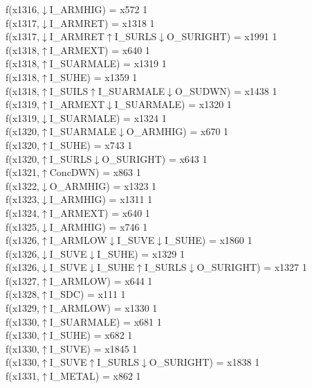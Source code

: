 f(x1316,$\downarrow$I\_ARMHIG) = x572 {1} \\
f(x1317,$\downarrow$I\_ARMRET) = x1318 {1} \\
f(x1317,$\downarrow$I\_ARMRET$\uparrow$I\_SURLS$\downarrow$O\_SURIGHT) = x1991 {1} \\
f(x1318,$\uparrow$I\_ARMEXT) = x640 {1} \\
f(x1318,$\uparrow$I\_SUARMALE) = x1319 {1} \\
f(x1318,$\uparrow$I\_SUHE) = x1359 {1} \\
f(x1318,$\uparrow$I\_SUILS$\uparrow$I\_SUARMALE$\downarrow$O\_SUDWN) = x1438 {1} \\
f(x1319,$\uparrow$I\_ARMEXT$\downarrow$I\_SUARMALE) = x1320 {1} \\
f(x1319,$\downarrow$I\_SUARMALE) = x1324 {1} \\
f(x1320,$\uparrow$I\_SUARMALE$\downarrow$O\_ARMHIG) = x670 {1} \\
f(x1320,$\uparrow$I\_SUHE) = x743 {1} \\
f(x1320,$\uparrow$I\_SURLS$\downarrow$O\_SURIGHT) = x643 {1} \\
f(x1321,$\uparrow$ConcDWN) = x863 {1} \\
f(x1322,$\downarrow$O\_ARMHIG) = x1323 {1} \\
f(x1323,$\downarrow$I\_ARMHIG) = x1311 {1} \\
f(x1324,$\uparrow$I\_ARMEXT) = x640 {1} \\
f(x1325,$\downarrow$I\_ARMHIG) = x746 {1} \\
f(x1326,$\uparrow$I\_ARMLOW$\downarrow$I\_SUVE$\downarrow$I\_SUHE) = x1860 {1} \\
f(x1326,$\downarrow$I\_SUVE$\downarrow$I\_SUHE) = x1329 {1} \\
f(x1326,$\downarrow$I\_SUVE$\downarrow$I\_SUHE$\uparrow$I\_SURLS$\downarrow$O\_SURIGHT) = x1327 {1} \\
f(x1327,$\uparrow$I\_ARMLOW) = x644 {1} \\
f(x1328,$\uparrow$I\_SDC) = x111 {1} \\
f(x1329,$\uparrow$I\_ARMLOW) = x1330 {1} \\
f(x1330,$\uparrow$I\_SUARMALE) = x681 {1} \\
f(x1330,$\uparrow$I\_SUHE) = x682 {1} \\
f(x1330,$\uparrow$I\_SUVE) = x1845 {1} \\
f(x1330,$\uparrow$I\_SUVE$\uparrow$I\_SURLS$\downarrow$O\_SURIGHT) = x1838 {1} \\
f(x1331,$\uparrow$I\_METAL) = x862 {1} \\
